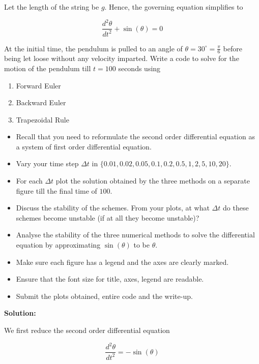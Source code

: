 \documentclass[a4paper,11pt]{report}
\begin{document}
\begin{enumerate}
    Let the length of the string be $g$. Hence, the governing equation simplifies to
                    
    \begin{equation*}
    \frac{d^{2} \theta}{dt^{2}} + \sin(\theta) = 0
    \end{equation*}

    At the initial time, the pendulum is pulled to an angle of $\theta = 30^{\circ} =
    \displaystyle \frac{\pi}{6}$
    before being let loose without any velocity imparted. Write a code to solve for the
    motion of the pendulum till $t = 100$ seconds using

    \begin{enumerate}
    \item Forward Euler
    \item Backward Euler
    \item Trapezoidal Rule
    \end{enumerate}

    \begin{itemize}
    \item Recall that you need to reformulate the second order differential equation as a
    system of first order differential equation.
    \item Vary your time step $\Delta t$ in $\{0.01, 0.02, 0.05, 0.1, 0.2, 0.5, 1, 2, 5,
    10, 20\}$.
    \item For each $\Delta t$ plot the solution obtained by the three methods on a separate
    figure till the final time of $100$.
    \item Discuss the stability of the schemes. From your plots, at what $\Delta t$ do these
    schemes become unstable (if at all they become unstable)?
    \item Analyse the stability of the three numerical methods to solve the differential
    equation by approximating $\sin(\theta)$ to be $\theta$.
    \item Make sure each figure has a legend and the axes are clearly marked.
    \item Ensure that the font size for title, axes, legend are readable.
    \item Submit the plots obtained, entire code and the write-up.
    \end{itemize}


    \textbf{Solution:}

    We first reduce the second order differential equation

    \begin{equation*}
    \frac{d^{2} \theta}{dt^{2}} = - \sin(\theta)
    \end{equation*}


\end{enumerate}
\end{document}
